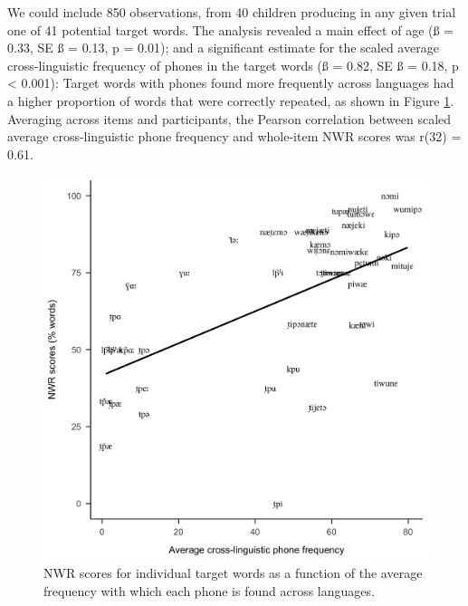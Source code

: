 \documentclass[english,,man,floatsintext]{apa6}
\begin{document}
We could include 850 observations, from 40 children producing in any given trial one of 41 potential target words. The analysis revealed a main effect of age (ß = 0.33, SE ß = 0.13, p = 0.01); and a significant estimate for the scaled average cross-linguistic frequency of phones in the target words (ß = 0.82, SE ß = 0.18, p \textless{} 0.001): Target words with phones found more frequently across languages had a higher proportion of words that were correctly repeated, as shown in Figure \ref{fig:Fig2-xling-freq}. Averaging across items and participants, the Pearson correlation between scaled average cross-linguistic phone frequency and whole-item NWR scores was r(32) = 0.61.

\begin{figure}[!t]

{\centering \includegraphics[width=0.65\linewidth]{nwr.by.freq.ITEM} 

}

\caption{NWR scores for individual target words as a function of the average frequency with which each phone is found across languages.}\label{fig:Fig2-xling-freq}
\end{figure}
\end{document}
